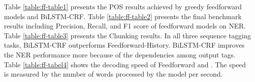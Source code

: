 Table \ref{table:ff-table1} presents the POS results achieved by greedy feedforward models and BiLSTM-CRF. Table \ref{table:ff-table2} presents the final benchmark results including Precision, Recall, and F1 score of feedforward models on NER. Table \ref{table:ff-table3} presents the Chunking results. In all three sequence tagging tasks, BiLSTM-CRF outperforms Feedforward-History. BiLSTM-CRF improves the NER performance more because of the dependencies among output tags. Table \ref{table:ff-tabel4} shows the decoding speed of Feedforward and \ffa. The speed is measured by the number of words processed by the model per second.




